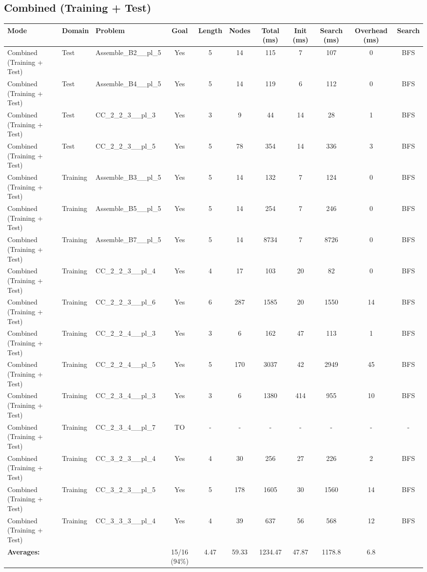 \documentclass{article}
\begin{document}
\subsection*{Combined (Training + Test)}
\begin{tabular}{lllcccccccc}
\toprule
Mode & Domain & Problem & Goal & Length & Nodes & Total (ms) & Init (ms) & Search (ms) & Overhead (ms) & Search \\
\midrule
Combined (Training + Test) & Test & Assemble\_B2\_\_pl\_5 & Yes & 5 & 14 & 115 & 7 & 107 & 0 & BFS \\
Combined (Training + Test) & Test & Assemble\_B4\_\_pl\_5 & Yes & 5 & 14 & 119 & 6 & 112 & 0 & BFS \\
Combined (Training + Test) & Test & CC\_2\_2\_3\_\_pl\_3 & Yes & 3 & 9 & 44 & 14 & 28 & 1 & BFS \\
Combined (Training + Test) & Test & CC\_2\_2\_3\_\_pl\_5 & Yes & 5 & 78 & 354 & 14 & 336 & 3 & BFS \\
Combined (Training + Test) & Training & Assemble\_B3\_\_pl\_5 & Yes & 5 & 14 & 132 & 7 & 124 & 0 & BFS \\
Combined (Training + Test) & Training & Assemble\_B5\_\_pl\_5 & Yes & 5 & 14 & 254 & 7 & 246 & 0 & BFS \\
Combined (Training + Test) & Training & Assemble\_B7\_\_pl\_5 & Yes & 5 & 14 & 8734 & 7 & 8726 & 0 & BFS \\
Combined (Training + Test) & Training & CC\_2\_2\_3\_\_pl\_4 & Yes & 4 & 17 & 103 & 20 & 82 & 0 & BFS \\
Combined (Training + Test) & Training & CC\_2\_2\_3\_\_pl\_6 & Yes & 6 & 287 & 1585 & 20 & 1550 & 14 & BFS \\
Combined (Training + Test) & Training & CC\_2\_2\_4\_\_pl\_3 & Yes & 3 & 6 & 162 & 47 & 113 & 1 & BFS \\
Combined (Training + Test) & Training & CC\_2\_2\_4\_\_pl\_5 & Yes & 5 & 170 & 3037 & 42 & 2949 & 45 & BFS \\
Combined (Training + Test) & Training & CC\_2\_3\_4\_\_pl\_3 & Yes & 3 & 6 & 1380 & 414 & 955 & 10 & BFS \\
Combined (Training + Test) & Training & CC\_2\_3\_4\_\_pl\_7 & TO & - & - & - & - & - & - & - \\
Combined (Training + Test) & Training & CC\_3\_2\_3\_\_pl\_4 & Yes & 4 & 30 & 256 & 27 & 226 & 2 & BFS \\
Combined (Training + Test) & Training & CC\_3\_2\_3\_\_pl\_5 & Yes & 5 & 178 & 1605 & 30 & 1560 & 14 & BFS \\
Combined (Training + Test) & Training & CC\_3\_3\_3\_\_pl\_4 & Yes & 4 & 39 & 637 & 56 & 568 & 12 & BFS \\
\textbf{Averages:} & & & 15/16 (94\%) & 4.47 & 59.33 & 1234.47 & 47.87 & 1178.8 & 6.8 & \\
\bottomrule
\end{tabular}
\newpage
\end{document}
